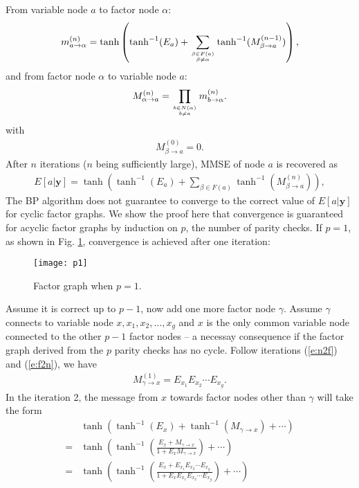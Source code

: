 \documentclass[12pt]{article}
\newcommand{\vect}[1]{\mathbf{#1}}
\begin{document}
From variable node $a$ to factor node $\alpha$:
\begin{align}
m_{a\rightarrow\alpha}^{(n)}=\tanh\left(\tanh^{-1}(E_a)+\sum_{\beta\in F(a)\atop \beta \neq \alpha}\tanh^{-1}(M_{\beta\rightarrow  a}^{(n-1)})\right), \label{e:n2f}
\end{align}
and from factor node $\alpha$ to variable node $a$:
\begin{align}
M_{\alpha\rightarrow a}^{(n)} = \prod_{b\in N(\alpha)\atop b \neq a}m_{b\rightarrow \alpha}^{(n)}. \label{e:f2n}
\end{align}
with
\begin{align}
M_{\beta\rightarrow a}^{(0)} = 0.
\end{align}
After $n$ iterations ($n$ being sufficiently large), MMSE of node $a$ is recovered as
\begin{align}
E[a|\vect{y}] = \tanh\left(\tanh^{-1}(E_a)+\sum_{\beta\in F(a)}\tanh^{-1}(M_{\beta\rightarrow  a}^{(n)})\right),
\end{align}
The BP algorithm does not guarantee to converge to the correct value of $E[a|\vect{y}]$ for cyclic factor graphs. We show the proof here that convergence is guaranteed for acyclic factor graphs by induction on $p$, the number of parity checks. If $p=1$, as shown in Fig. \ref{f:p=1}, convergence is achieved after one iteration:
\begin{figure}[h]
\centering
\texttt{[image: p1]}
\caption{Factor graph when $p=1$.}
\label{f:p=1}
\end{figure}
Assume it is correct up to $p-1$, now add one more factor node $\gamma$. Assume $\gamma$ connects to variable node $x, x_1, x_2, \ldots, x_g$ and $x$ is the only common variable node connected to the other $p-1$ factor nodes -- a necessay consequence if the factor graph derived from the $p$ parity checks has no cycle. Follow iterations (\ref{e:n2f}) and (\ref{e:f2n}), we have
\begin{align*}
M_{\gamma\rightarrow x}^{(1)} = E_{x_1}E_{x_2}\cdots E_{x_g}.
\end{align*}
In the iteration 2, the message from $x$ towards factor nodes other than $\gamma$ will take the form
\begin{align*}
&\tanh\left(\tanh^{-1}(E_x) + \tanh^{-1}(M_{\gamma\rightarrow x})+\cdots \right)\\
=&\tanh\left(\tanh^{-1}\left(\frac{E_x + M_{\gamma\rightarrow x}}{1+E_xM_{\gamma\rightarrow x}}\right)+\cdots\right)\\
=&\tanh\left(\tanh^{-1}\left(\frac{E_x + E_{x_1}E_{x_2}\cdots E_{x_g}}{1+E_xE_{x_1}E_{x_2}\cdots E_{x_g}}\right)+\cdots\right)
\end{align*}
\end{document}

